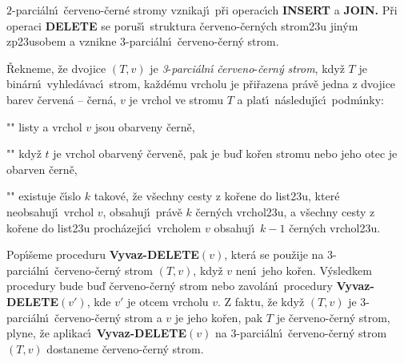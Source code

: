 \midinsert
\centerline{}
\endcaption
\endinsert
\newpage

\midinsert
\centerline{}
\endcaption
\endinsert

\flushpar$2$-parci\'aln\'\i\ \v cerveno-\v cern\'e stromy vznikaj\'\i\ p\v ri 
operac\'\i ch {\bf INSERT} a {\bf JOIN.}  P\v ri operaci {\bf DELETE} se poru\v s\'\i\ 
struktura \v cerveno-\v cern\'ych strom\accent23u jin\'ym 
zp\accent23usobem a vznikne 3-parci\'aln\'\i\ \v cerveno-\v cer\-n\'y strom.  
\medskip

\flushpar\v Rekneme, \v ze dvojice $(T,v)$ je \emph{3}-\emph{parci\'aln\'\i} 
\emph{\v cerveno}-\emph{\v cern\'y} \emph{strom}, kdy\v z $T$ je bin\'arn\'\i\ 
vy\-hled\'avac\'\i\ strom, ka\v zd\'emu vrcholu je p\v ri\-\v razena pr\'av\v e jedna z 
dvojice barev \v cerven\'a -- \v cern\'a, $v$ je vrchol ve stromu $
T$ a 
plat\'\i\ n\'asleduj\'\i c\'\i\ podm\'\i nky: 
\roster
\item"{}"
listy a vrchol $v$ jsou obarveny \v cern\v e,
\item"{}"
kdy\v z $t$ je vrchol obarven\'y \v cerven\v e, pak je bu\v d ko\v ren 
stromu nebo jeho otec je obarven \v cern\v e,
\item"{}"
existuje \v c\'\i slo $k$ takov\'e, \v ze v\v sechny cesty z ko\v rene do 
list\accent23u, kter\'e neobsahuj\'\i\ vrchol $v$, obsahuj\'\i\ pr\'av\v e 
$k$ \v cer\-n\'ych vrchol\accent23u, a v\v sechny cesty z ko\v rene do 
list\accent23u proch\'a\-ze\-j\'\i\-c\'\i\ vrcholem $v$ obsahuj\'\i\ $
k-1$ \v cern\'ych 
vrchol\accent23u.
\endroster
\medskip

\flushpar Pop\'\i\v seme proceduru {\bf Vyvaz-DELETE$(v)$}, kter\'a se 
pou\v zije na 3-parci\'aln\'\i\ \v cerveno-\v cern\'y strom $(T,v)$, kdy\v z $
v$ nen\'\i\ jeho 
ko\v ren.  V\'ysledkem procedury bude bu\v d \v cerveno-\v cern\'y strom 
nebo zavol\'an\'\i\ procedury {\bf Vyvaz-DELE\-TE$(v')$}, kde $v'$ je otcem 
vrcholu $v$.  Z faktu, \v ze kdy\v z $(T,v)$ je 3-parci\'aln\'\i\ \v cerveno-\v cern\'y 
strom a $v$ je jeho ko\v ren, pak $T$ je \v cerveno-\v cern\'y strom, plyne, 
\v ze aplikac\'\i\ {\bf Vyvaz-DELETE$(v)$} na 3-parci\'aln\'\i\ \v cerveno-\v cern\'y strom 
$(T,v)$ dostaneme \v cerveno-\v cern\'y strom.  
\medskip


